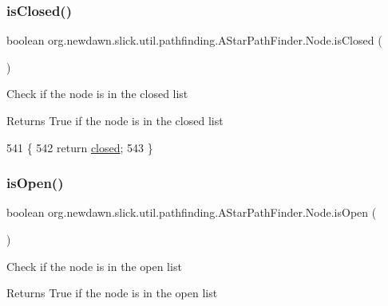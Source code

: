 \subsubsection{\texorpdfstring{is\+Closed()}{isClosed()}}
{\footnotesize\ttfamily boolean org.\+newdawn.\+slick.\+util.\+pathfinding.\+A\+Star\+Path\+Finder.\+Node.\+is\+Closed (\begin{DoxyParamCaption}{ }\end{DoxyParamCaption})\hspace{0.3cm}{\ttfamily [inline]}}

Check if the node is in the closed list

\begin{DoxyReturn}{Returns}
True if the node is in the closed list 
\end{DoxyReturn}

\begin{DoxyCode}
541                                   \{
542             \textcolor{keywordflow}{return} \mbox{\hyperlink{classorg_1_1newdawn_1_1slick_1_1util_1_1pathfinding_1_1_a_star_path_finder_1_1_node_a5fa6d77e8305e6028fdabdb8ad5cb00f}{closed}};
543         \}
\end{DoxyCode}
\mbox{\label{classorg_1_1newdawn_1_1slick_1_1util_1_1pathfinding_1_1_a_star_path_finder_1_1_node_abd6adff3084b80d6020e721bee8f2f78}} 
\subsubsection{\texorpdfstring{is\+Open()}{isOpen()}}
{\footnotesize\ttfamily boolean org.\+newdawn.\+slick.\+util.\+pathfinding.\+A\+Star\+Path\+Finder.\+Node.\+is\+Open (\begin{DoxyParamCaption}{ }\end{DoxyParamCaption})\hspace{0.3cm}{\ttfamily [inline]}}

Check if the node is in the open list

\begin{DoxyReturn}{Returns}
True if the node is in the open list 
\end{DoxyReturn}

